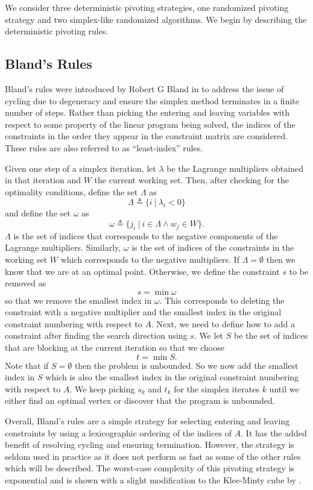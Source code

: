 \documentclass{standalone}
\begin{document}
We consider three deterministic pivoting strategies, one randomized pivoting strategy and two simplex-like randomized algorithms. We begin by describing the deterministic pivoting rules.
\subsection{Bland's Rules}
\label{sec:pivot:bland}
{
  Bland's rules were introduced by Robert G Bland in \cite{bland1977new} to address the issue of cycling due to degeneracy and ensure the simplex method terminates in a finite number of steps. Rather than picking the entering and leaving variables with respect to some property of the linear program being solved, the indices of the constraints in the order they appear in the constraint matrix are considered. These rules are also referred to as ``least-index'' rules.\par
  Given one step of a simplex iteration, let $\lambda$ be the Lagrange multipliers obtained in that iteration and $W$ the current working set. Then, after checking for the optimality conditions, define the set $\Lambda$ as
  \[
    \Lambda \triangleq \{i\:|\:\lambda_{i}<0\}
  \]
  and define the set $\omega$ as
  \[
    \omega \triangleq \{j_{i}\:|\:i\in\Lambda\land w_{j}\in W\}.
  \]
  $\Lambda$ is the set of indices that corresponds to the negative components of the Lagrange multipliers. Similarly, $\omega$ is the set of indices of the constraints in the working set $W$ which corresponds to the negative multipliers. If $\Lambda=\emptyset$ then we know that we are at an optimal point. Otherwise, we define the constraint $s$ to be removed as
  \[
    s = \min \omega
  \]
  so that we remove the smallest index in $\omega$. This corresponds to deleting the constraint with a negative multiplier and the smallest index in the original constraint numbering with respect to $A$. Next, we need to define how to add a constraint after finding the search direction using $s$. We let $S$ be the set of indices that are blocking at the current iteration so that we choose
  \[
    t = \min S.
  \]
  Note that if $S=\emptyset$ then the problem is unbounded. So we now add the smallest index in $S$ which is also the smallest index in the original constraint numbering with respect to $A$. We keep picking $s_{k}$ and $t_{k}$ for the simplex iterates $k$ until we either find an optimal vertex or discover that the program is unbounded.\par
  Overall, Bland's rules are a simple strategy for selecting entering and leaving constraints by using a lexicographic ordering of the indices of $A$. It has the added benefit of resolving cycling and ensuring termination. However, the strategy is seldom used in practice as it does not perform as fast as some of the other rules which will be described. The worst-case complexity of this pivoting strategy is exponential and is shown with a slight modification to the Klee-Minty cube \cite{klee1972good} by \cite{murty1983linear}.
}
\end{document}
